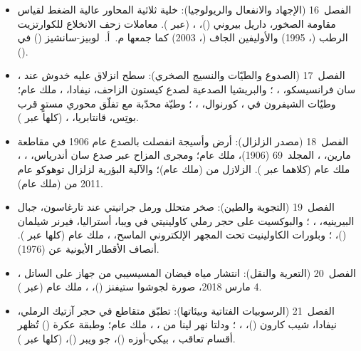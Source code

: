 \begin{itemize}
  \item الفصل~16 (الإجهاد والانفعال والريولوجيا): خلية ثلاثية المحاور عالية الضغط لقياس مقاومة الصخور، داريل بيروني ()، ،  (عبر ). معاملات زحف الانخلاع للكوارتزيت الرطب (، 1995) والأوليفين الجاف (، 2003) كما جمعها م.~أ.~لوبيز-سانشيز () في  ().
  \item الفصل~17 (الصدوع والطيّات والنسيج الصخري): سطح انزلاق عليه خدوش عند ، سان فرانسيسكو، ، ؛ والبريشيا الصدعية لصدع كيستون الزاحف، نيفادا، ، ملك عام؛ وطيّات الشيفرون في ، كورنوال، ، ؛ وطيّة محدّبة مع تفلّق محوري مستوٍ قرب بوتِس، قانتابريا، ،  (كلها عبر ).
  \item الفصل~18 (مصدر الزلزال): أرض وأسيجة انفصلت بالصدع عام 1906 في مقاطعة مارين، ، المجلد~69 (1906)، ملك عام؛ ومجرى  المزاح عبر صدع سان أندرياس، ، ، ملك عام (كلاهما عبر ). الزلازل من  (ملك عام)؛ والآلية البؤرية لزلزال توهوكو عام 2011 من  (ملك عام).
  \item الفصل~19 (التجوية والطين): صخر متحلل ورمل جرانيتي عند تارغاسون، جبال البيرينيه، ، ؛ والبوكسيت على حجر رملي كاولينيتي في ويبا، أستراليا، فيرنر شيلمان ()، ؛ وبلورات الكاولينيت تحت المجهر الإلكتروني الماسح، ، ملك عام (كلها عبر ). أنصاف الأقطار الأيونية عن  (1976).
  \item الفصل~20 (التعرية والنقل): انتشار مياه فيضان المسيسيبي من جهاز  على الساتل ، 4 مارس 2018، صورة لجوشوا ستيفنز ()، ، ملك عام (عبر ).
  \item الفصل~21 (الرسوبيات الفتاتية وبيئاتها): تطبّق متقاطع في حجر آزتيك الرملي، نيفادا، شيب كارون ()، ، ؛ ودلتا نهر لينا من ، ، ملك عام؛ وطبقة عكرة () تُظهر أقسام تعاقب ، بيكي-أوزه ()، جو ويبر ()،  (كلها عبر ).

\end{itemize}
